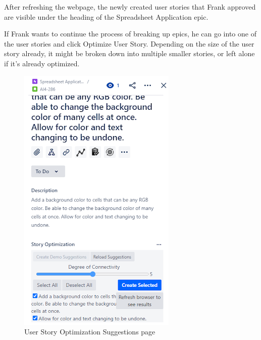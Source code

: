 After refreshing the webpage, the newly created user stories that Frank approved are visible under the heading of the Spreadsheet Application epic.

If Frank wants to continue the process of breaking up epics, he can go into one of the user stories and click Optimize User Story. Depending on the size of the user story already, it might be broken down into multiple smaller stories, or left alone if it’s already optimized.

\begin{figure}
\centerline{\includegraphics[scale=0.65,width=\textwidth,height=\textheight,keepaspectratio]{./figure/Scenario1Figure3.png}}
\caption{User Story Optimization Suggestions page}
\end{figure}

